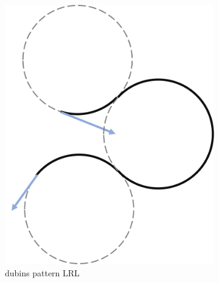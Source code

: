 \begin{figure}
     \centering
     \begin{subfigure}[b]{0.4\textwidth}
         \centering
         \includegraphics[scale=0.7]{fig/dubins/LRL.png}
         \caption{dubins pattern LRL}
         \label{fig: dubins pattern LRL}
     \end{subfigure}
     \hfill
     \begin{subfigure}[b]{0.4\textwidth}
         \centering

\end{subfigure}
\end{figure}
